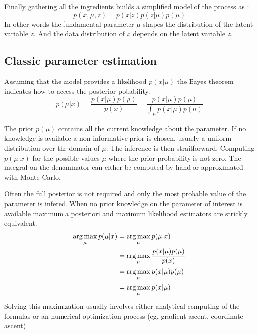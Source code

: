 Finally gathering all the ingredients builds a simplified model of the process as :
\begin{equation}
	\label{eq:model_simple}
	p(x, \mu, z) = p(x|z) p(z | \mu) p(\mu)
\end{equation}
In other words the fundamental parameter $\mu$ shapes the distribution of the latent variable $z$.
And the data distribution of $x$ depends on the latent variable $z$.





\subsection{Classic parameter estimation} %
\label{sub:classic_parameter_estimation}



Assuming that the model provides a likelihood $p(x | \mu)$ the Bayes theorem indicates how to access the posterior pobability.
\begin{equation}	
    p(\mu | x) = \frac{p(x|\mu) p(\mu)}{p(x)} = \frac{p(x|\mu) p(\mu)}{\int_\mu p(x|\mu) p(\mu)}
\end{equation}

The prior $p(\mu)$ contains all the current knowledge about the parameter. 
If no knowledge is available a non informative prior is chosen, usually a uniform distribution over the domain of $\mu$.
The inference is then straitforward.
Computing $p(\mu | x)$ for the possible values $\mu$ \ie where the prior probability is not zero.
The integral on the denominator can either be computed by hand or approximated with Monte Carlo.

Often the full posterior is not required and only the most probable value of the parameter is infered.
When no prior knowledge on the parameter of interest is available maximum a posteriori and maximum likelihood estimators are strickly equivalent.
\begin{align}
	\operatorname*{arg\,max}_\mu p(\mu | x) &= \operatorname*{arg\,max}_\mu p(\mu | x) \\
							&= \operatorname*{arg\,max}_\mu \frac{p(x|\mu) p(\mu)}{p(x)} \\
							&= \operatorname*{arg\,max}_\mu p(x|\mu) p(\mu) \\
							&= \operatorname*{arg\,max}_\mu p(x|\mu)\\
\end{align}
Solving this maximization usually involves either analytical computing of the formulas  or an numerical optimization process (eg. gradient ascent, coordinate ascent)








